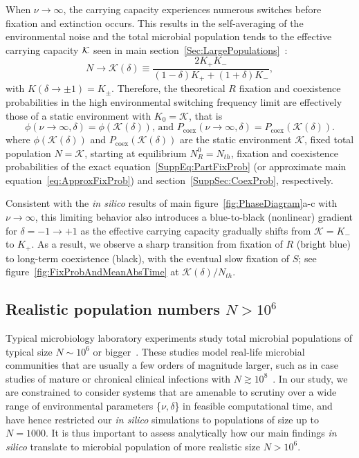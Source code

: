 \documentclass{article}
\begin{document}
When \(\nu\rightarrow\infty\), the carrying capacity experiences numerous switches before fixation and extinction occurs. This results in the self-averaging of the environmental noise and the total microbial population tends to the effective carrying capacity ${\cal K}$ seen in main section~\ref{Sec:LargePopulations}~\cite{wienand2017evolution,wienand2018eco,west2020,taitelbaum2020population,Shibasaki2021,taitelbaum2023evolutionary}: \[N\rightarrow\mathcal{K(\delta)}\equiv\frac{2K_+K_-}{(1-\delta)K_++(1+\delta)K_-},\] with $K(\delta\to \pm 1)= K_{\pm}$. Therefore, the theoretical $R$ fixation and coexistence probabilities in the high environmental switching frequency limit are effectively those of a static environment with \(K_{0}=\mathcal{K}\), that is
\begin{equation}
    \phi\left(\nu\rightarrow\infty,\delta\right)=\phi\left(\mathcal{K}(\delta)\right)\text{, and~}P_{\text{coex}}\left(\nu\rightarrow\infty,\delta\right)=P_{\text{coex}}\left(\mathcal{K}(\delta)\right).
\label{SuppEq:FastFixCoexProb}
\end{equation}
where \(\phi\left(\mathcal{K}\left(\delta\right)\right)\) and \(P_{\text{coex}}\left(\mathcal{K}\left(\delta\right)\right)\) are the static environment \(\mathcal{K}\), fixed total population \(N=\mathcal{K}\), starting at equilibrium \(N_R^0=N_{th}\), fixation and coexistence probabilities of the exact equation~\eqref{SuppEq:PartFixProb} (or approximate main equation~\eqref{eq:ApproxFixProb}) and section~\ref{SuppSec:CoexProb}, respectively.

Consistent with the {\it in silico} results of main figure~\ref{fig:PhaseDiagram}a-c with \(\nu\rightarrow\infty\), this limiting behavior also introduces a blue-to-black (nonlinear) gradient for \(\delta=-1\to+1\) as the effective carrying capacity gradually shifts from \(\mathcal{K}=K_{-}\) to \(K_{+}\). As a result, we observe a sharp transition from fixation of $R$ (bright blue) to long-term coexistence (black), with the eventual slow fixation of $S$; see figure~\ref{fig:FixProbAndMeanAbsTime} at \(\mathcal{K}\left(\delta\right)/N_{th}\).

\subsection{Realistic population numbers \(N>10^{6}\)}\label{SuppSec:BigPop}
Typical microbiology laboratory experiments study total microbial populations of typical size \(N\sim10^{6}\) or bigger~\cite{sanchez2013feedback}. These studies  model real-life microbial communities that are usually a few orders of magnitude larger, such as in case studies of mature or chronical clinical infections with \(N\gtrsim10^8\)~\cite{Coates18, smith1956experimental, canetti1956dynamic, feldman1976concentrations, palaci2007cavitary}. In our study, we are constrained to consider systems that are amenable to scrutiny over a wide range of environmental parameters \{\(\nu,\delta\)\} in feasible computational time, and have hence  restricted our {\it in silico} simulations to populations of size up to \(N=1000\). It is thus important to assess analytically how our main findings {\it in silico} translate to  microbial population of more realistic size \(N>10^{6}\).
\end{document}
